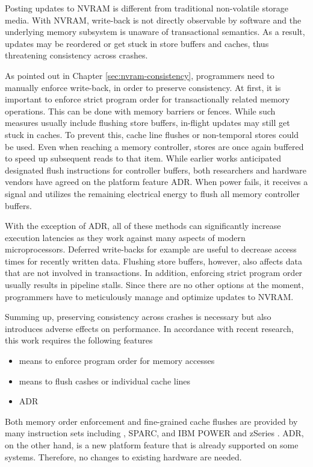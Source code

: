 Posting updates to NVRAM is different from traditional non-volatile storage
media. With NVRAM, write-back is not directly observable by software and the
underlying memory subsystem is unaware of transactional semantics. As a result,
updates may be reordered or get stuck in store buffers and caches, thus
threatening consistency across crashes.

As pointed out in Chapter \ref{sec:nvram-consistency}, programmers need to
manually enforce write-back, in order to preserve consistency. At first, it is
important to enforce strict program order for transactionally related memory
operations. This can be done with memory barriers or fences. While such measures
usually include flushing store buffers, in-flight updates may still get stuck in
caches. To prevent this, cache line flushes or non-temporal stores could be
used. Even when reaching a memory controller, stores are once again buffered to
speed up subsequent reads to that item. While earlier works anticipated
designated flush instructions for controller buffers, both researchers and
hardware vendors have agreed on the platform feature ADR. When power fails, it
receives a signal and utilizes the remaining electrical energy to flush all
memory controller buffers.

With the exception of ADR, all of these methods can significantly increase
execution latencies as they work against many aspects of modern microprocessors.
Deferred write-backs for example are useful to decrease access times for
recently written data. Flushing store buffers, however, also affects data that
are not involved in transactions. In addition, enforcing strict program order
usually results in pipeline stalls. Since there are no other options at the
moment, programmers have to meticulously manage and optimize updates to NVRAM.

Summing up, preserving consistency across crashes is necessary but also
introduces adverse effects on performance. In accordance with recent research,
this work requires the following features

\begin{itemize}
    \item means to enforce program order for memory accesses
    \item means to flush cashes or individual cache lines
    \item ADR
\end{itemize}

Both memory order enforcement and fine-grained cache flushes are provided by
many instruction sets including , SPARC, and IBM POWER and zSeries
\cite{mckenney2007memory}. ADR, on the other hand, is a new platform feature
that is already supported on some systems. Therefore, no changes to existing
hardware are needed.
